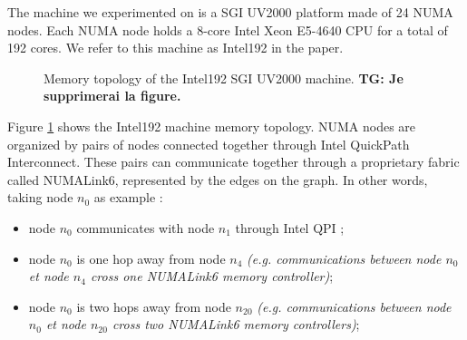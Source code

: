 \documentclass{Styles/llncs}
\newcommand{\TG}[1]{{\color{red}\bfseries TG: #1}}
\begin{document}
The machine we experimented on is a SGI UV2000 platform made of 24 NUMA nodes.
Each NUMA node holds a 8-core Intel Xeon E5-4640 CPU for a total of 192 cores.
We refer to this machine as Intel192 in the paper. 

\begin{figure}
\begin{center}
\end{center}
\caption{Memory topology of the Intel192 SGI UV2000 machine. \TG{Je supprimerai la figure.}}
\label{fig:idchire}
\end{figure}

Figure \ref{fig:idchire} shows the Intel192 machine memory topology.
NUMA nodes are organized by pairs of nodes connected together through Intel QuickPath Interconnect.
These pairs can communicate together through a proprietary fabric called NUMALink6, represented by the edges on the graph.
In other words, taking node $n_0$ as example :
\begin{itemize}
\item node $n_0$ communicates with node $n_1$ through Intel QPI ;
\item node $n_0$ is one hop away from node $n_4$ \emph{(e.g. communications between node $n_0$ et node $n_4$ cross one NUMALink6 memory controller)};
\item node $n_0$ is two hops away from node $n_{20}$ \emph{(e.g. communications between node $n_0$ et node $n_{20}$ cross two NUMALink6 memory controllers)};
\end{itemize}
\end{document}
